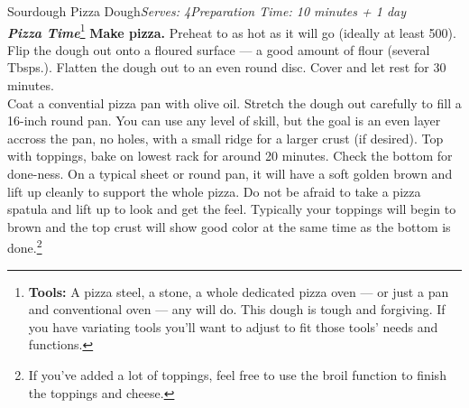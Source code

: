 \documentclass{article}
\begin{document}
\begin{recipe}{Sourdough Pizza Dough}{\textit{Serves: 4}}{\textit{Preparation Time: 10 minutes + 1 day}}
  \freeform
    \\
    \textbf{\textit{Pizza Time}}\footnote{
      \textbf{Tools:} A pizza steel, a stone, a whole dedicated pizza oven --- or just a pan and conventional oven --- any will do. This dough is tough and forgiving. If you have variating tools you'll want to adjust to fit those tools' needs and functions.
    }
  \newstep
    \textbf{Make pizza.}
    Preheat to as hot as it will go (ideally at least 500\0).
    Flip the dough out onto a floured surface --- a good amount of flour (several Tbsps.).
    Flatten the dough out to an even round disc.
    Cover and let rest for 30 minutes.
    \\
    Coat a convential pizza pan with olive oil.
    Stretch the dough out carefully to fill a 16-inch round pan.
    You can use any level of skill, but the goal is an even layer accross the pan, no holes, with a small ridge for a larger crust (if desired).
    Top with toppings, bake on lowest rack for around 20 minutes.
    Check the bottom for done-ness.
    On a typical sheet or round pan, it will have a soft golden brown and lift up cleanly to support the whole pizza.
    Do not be afraid to take a pizza spatula and lift up to look and get the feel.
    Typically your toppings will begin to brown and the top crust will show good color at the same time as the bottom is done.\footnote{
      If you've added a lot of toppings, feel free to use the broil function to finish the toppings and cheese.
    }

\end{recipe}

\theendnotes
\end{document}
